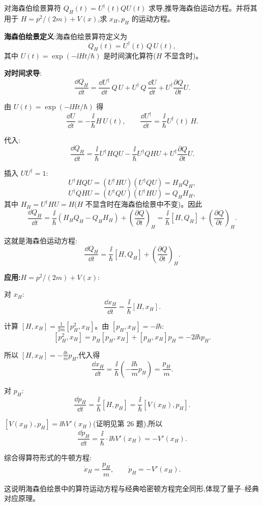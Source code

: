 \begin{question}
对海森伯绘景算符 $Q_H(t)=U^\dagger(t)QU(t)$ 求导,推导海森伯运动方程。并将其用于 $H=p^2/(2m)+V(x)$,求 $x_H,p_H$ 的运动方程。
\end{question}
\begin{solution}
	\textbf{海森伯绘景定义}:海森伯绘景算符定义为
	\[
	Q_H(t) = U^\dagger(t)\,Q\,U(t),
	\]
	其中 $U(t)=\exp(-\ii Ht/\hbar)$ 是时间演化算符($H$ 不显含时)。

	\textbf{对时间求导}:
	\[
	\frac{\dd Q_H}{\dd t} = \frac{\dd U^\dagger}{\dd t}\,Q\,U + U^\dagger\,Q\,\frac{\dd U}{\dd t} + U^\dagger\frac{\partial Q}{\partial t}U.
	\]

	由 $U(t)=\exp(-\ii Ht/\hbar)$ 得
	\[
	\frac{\dd U}{\dd t} = -\frac{\ii}{\hbar}H\,U(t),\qquad
	\frac{\dd U^\dagger}{\dd t} = \frac{\ii}{\hbar}U^\dagger(t)\,H.
	\]

	代入:
	\[
	\frac{\dd Q_H}{\dd t} = \frac{\ii}{\hbar}U^\dagger H Q U - \frac{\ii}{\hbar}U^\dagger Q H U + U^\dagger\frac{\partial Q}{\partial t}U.
	\]

	插入 $UU^\dagger=1$:
	\[
	U^\dagger H Q U = (U^\dagger H U)(U^\dagger Q U) = H_H Q_H,
	\]
	\[
	U^\dagger Q H U = (U^\dagger Q U)(U^\dagger H U) = Q_H H_H,
	\]
	其中 $H_H=U^\dagger H U = H$($H$ 不显含时在海森伯绘景中不变)。因此
	\[
	\frac{\dd Q_H}{\dd t} = \frac{\ii}{\hbar}(H_H Q_H - Q_H H_H) + \left(\frac{\partial Q}{\partial t}\right)_H
	= \frac{\ii}{\hbar}[H,Q_H] + \left(\frac{\partial Q}{\partial t}\right)_H.
	\]

	这就是海森伯运动方程:
	\[
	\boxed{\frac{\dd Q_H}{\dd t} = \frac{\ii}{\hbar}[H,Q_H] + \left(\frac{\partial Q}{\partial t}\right)_H}.
	\]

	\textbf{应用:$H=p^2/(2m)+V(x)$}:

	对 $x_H$:
	\[
	\frac{\dd x_H}{\dd t} = \frac{\ii}{\hbar}[H,x_H].
	\]

	计算 $[H,x_H] = \frac{1}{2m}[p_H^2,x_H]$。由 $[p_H,x_H]=-\ii\hbar$:
	\[
	[p_H^2,x_H] = p_H[p_H,x_H] + [p_H,x_H]p_H = -2\ii\hbar p_H.
	\]

	所以 $[H,x_H] = -\frac{\ii\hbar}{m}p_H$,代入得
	\[
	\frac{\dd x_H}{\dd t} = \frac{\ii}{\hbar}\left(-\frac{\ii\hbar}{m}p_H\right) = \frac{p_H}{m}.
	\]

	对 $p_H$:
	\[
	\frac{\dd p_H}{\dd t} = \frac{\ii}{\hbar}[H,p_H] = \frac{\ii}{\hbar}[V(x_H),p_H].
	\]

	$[V(x_H),p_H] = \ii\hbar V'(x_H)$(证明见第 26 题),所以
	\[
	\frac{\dd p_H}{\dd t} = \frac{\ii}{\hbar}\cdot\ii\hbar V'(x_H) = -V'(x_H).
	\]

	综合得算符形式的牛顿方程:
	\[
	\boxed{\dot x_H = \frac{p_H}{m}},\qquad
	\boxed{\dot p_H = -V'(x_H)}.
	\]

	这说明海森伯绘景中的算符运动方程与经典哈密顿方程完全同形,体现了量子--经典对应原理。
	\end{solution}


